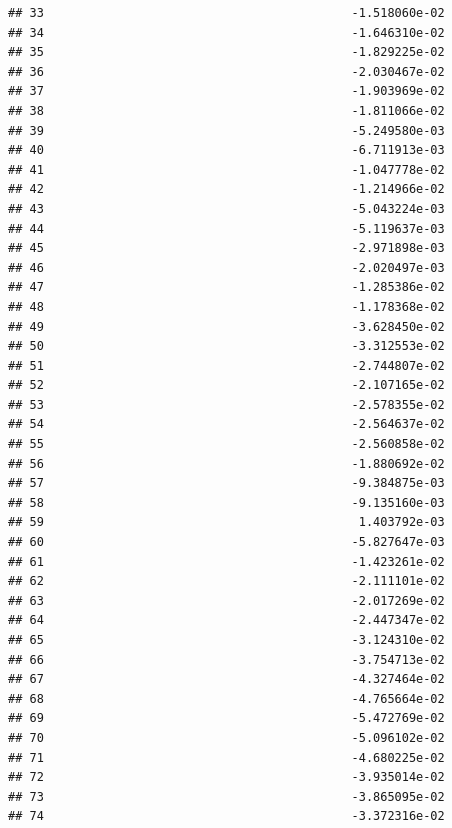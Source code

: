 \documentclass[
]{article}
\begin{document}
\begin{verbatim}
## 33                                           -1.518060e-02
## 34                                           -1.646310e-02
## 35                                           -1.829225e-02
## 36                                           -2.030467e-02
## 37                                           -1.903969e-02
## 38                                           -1.811066e-02
## 39                                           -5.249580e-03
## 40                                           -6.711913e-03
## 41                                           -1.047778e-02
## 42                                           -1.214966e-02
## 43                                           -5.043224e-03
## 44                                           -5.119637e-03
## 45                                           -2.971898e-03
## 46                                           -2.020497e-03
## 47                                           -1.285386e-02
## 48                                           -1.178368e-02
## 49                                           -3.628450e-02
## 50                                           -3.312553e-02
## 51                                           -2.744807e-02
## 52                                           -2.107165e-02
## 53                                           -2.578355e-02
## 54                                           -2.564637e-02
## 55                                           -2.560858e-02
## 56                                           -1.880692e-02
## 57                                           -9.384875e-03
## 58                                           -9.135160e-03
## 59                                            1.403792e-03
## 60                                           -5.827647e-03
## 61                                           -1.423261e-02
## 62                                           -2.111101e-02
## 63                                           -2.017269e-02
## 64                                           -2.447347e-02
## 65                                           -3.124310e-02
## 66                                           -3.754713e-02
## 67                                           -4.327464e-02
## 68                                           -4.765664e-02
## 69                                           -5.472769e-02
## 70                                           -5.096102e-02
## 71                                           -4.680225e-02
## 72                                           -3.935014e-02
## 73                                           -3.865095e-02
## 74                                           -3.372316e-02

\end{verbatim}
\end{document}
